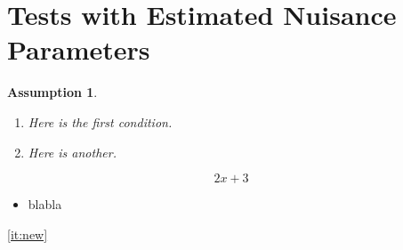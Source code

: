 \documentclass{article}
\newtheorem{ass}{Assumption}
\begin{document}
\section{Tests with Estimated Nuisance Parameters}
\label{sec:testWithPihat}

\begin{ass}
  \label{ass:C}
  \begin{enumerate}
  \item\label{ass:C:First} Here is the first condition.
  \item\label{ass:C:Second} Here is another.
  \end{enumerate}
\end{ass}

\begin{equation*}
  2x +3
\end{equation*}

\begin{itemize}
\item \label{it:new} blabla
\end{itemize}

\ref{it:new}
\end{document}
